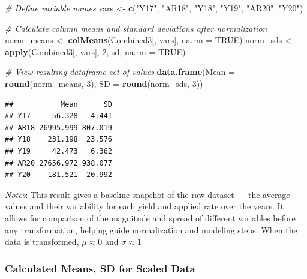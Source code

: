 \documentclass[
]{article}
\newenvironment{Shaded}{\begin{snugshade}}{\end{snugshade}}
\newcommand{\AttributeTok}[1]{\textcolor[rgb]{0.13,0.29,0.53}{#1}}
\newcommand{\CommentTok}[1]{\textcolor[rgb]{0.56,0.35,0.01}{\textit{#1}}}
\newcommand{\ConstantTok}[1]{\textcolor[rgb]{0.56,0.35,0.01}{#1}}
\newcommand{\DecValTok}[1]{\textcolor[rgb]{0.00,0.00,0.81}{#1}}
\newcommand{\FunctionTok}[1]{\textcolor[rgb]{0.13,0.29,0.53}{\textbf{#1}}}
\newcommand{\NormalTok}[1]{#1}
\newcommand{\OtherTok}[1]{\textcolor[rgb]{0.56,0.35,0.01}{#1}}
\newcommand{\StringTok}[1]{\textcolor[rgb]{0.31,0.60,0.02}{#1}}
\begin{document}
\begin{Shaded}
\begin{Highlighting}[]
\CommentTok{\# Define variable names}
\NormalTok{vars }\OtherTok{\textless{}{-}} \FunctionTok{c}\NormalTok{(}\StringTok{"Y17"}\NormalTok{, }\StringTok{"AR18"}\NormalTok{, }\StringTok{"Y18"}\NormalTok{, }\StringTok{"Y19"}\NormalTok{, }\StringTok{"AR20"}\NormalTok{, }\StringTok{"Y20"}\NormalTok{)}

\CommentTok{\# Calculate column means and standard deviations after normalization}
\NormalTok{norm\_means }\OtherTok{\textless{}{-}} \FunctionTok{colMeans}\NormalTok{(Combined3[, vars], }\AttributeTok{na.rm =} \ConstantTok{TRUE}\NormalTok{)}
\NormalTok{norm\_sds   }\OtherTok{\textless{}{-}} \FunctionTok{apply}\NormalTok{(Combined3[, vars], }\DecValTok{2}\NormalTok{, sd, }\AttributeTok{na.rm =} \ConstantTok{TRUE}\NormalTok{)}

\CommentTok{\# View resulting dataframe set of values}
\FunctionTok{data.frame}\NormalTok{(}\AttributeTok{Mean =} \FunctionTok{round}\NormalTok{(norm\_means, }\DecValTok{3}\NormalTok{), }\AttributeTok{SD =} \FunctionTok{round}\NormalTok{(norm\_sds, }\DecValTok{3}\NormalTok{))}
\end{Highlighting}
\end{Shaded}

\begin{verbatim}
##           Mean      SD
## Y17     56.328   4.441
## AR18 26995.999 807.019
## Y18    231.198  23.576
## Y19     42.473   6.362
## AR20 27656.972 938.077
## Y20    181.521  20.992
\end{verbatim}

\emph{Notes}: This result gives a baseline snapshot of the raw dataset
--- the average values and their variability for each yield and applied
rate over the years. It allows for comparison of the magnitude and
spread of different variables before any transformation, helping guide
normalization and modeling steps. When the data is transformed,
\(\mu \approx 0\) and \(\sigma \approx 1\)

\subsubsection{Calculated Means, SD for Scaled
Data}\label{calculated-means-sd-for-scaled-data}
\end{document}
